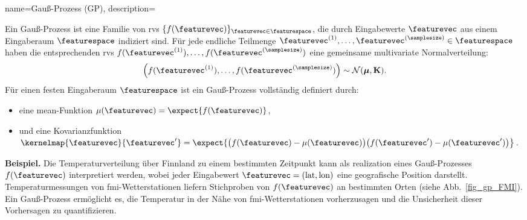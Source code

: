 {{
{name={Gauß-Prozess (GP)},
	description={Ein Gauß-Prozess ist eine Familie von \gls{rv}s 
		$\{f(\featurevec)\}_{\featurevec \in \featurespace}$, die durch Eingabewerte $\featurevec$ 
		aus einem Eingaberaum $\featurespace$ indiziert sind. Für jede endliche Teilmenge 
		$\featurevec^{(1)}, \ldots, \featurevec^{(\samplesize)} \in \featurespace$ 
		haben die entsprechenden \gls{rv}s $f(\featurevec^{(1)}), \ldots, f(\featurevec^{(\samplesize)})$ 
		eine gemeinsame multivariate Normalverteilung:
		\[
		\left( f(\featurevec^{(1)}), \ldots, f(\featurevec^{(\samplesize)}) \right) \sim \mathcal{N}(\boldsymbol{\mu}, \mathbf{K}).
		\]
		Für einen festen Eingaberaum $\featurespace$ ist ein Gauß-Prozess vollständig definiert durch:
		\begin{itemize}
			\item eine \gls{mean}-Funktion $\mu(\featurevec) = \expect\{ f(\featurevec)\}$,
			\item und eine Kovarianzfunktion $\kernelmap{\featurevec}{\featurevec'}= \expect\{ \big(f(\featurevec)-\mu(\featurevec)\big) \big(f(\featurevec')-\mu(\featurevec')\big) \big\}$.
		\end{itemize}
		\textbf{Beispiel.} Die Temperaturverteilung über Finnland zu einem bestimmten Zeitpunkt kann als \gls{realization} eines Gauß-Prozesses $f(\featurevec)$ interpretiert werden, wobei jeder Eingabewert $\featurevec = (\text{lat}, \text{lon})$ eine geografische Position darstellt. Temperaturmessungen von \gls{fmi}-Wetterstationen liefern Stichproben von $f(\featurevec)$ an bestimmten Orten (siehe Abb.\ \ref{fig_gp_FMI}). Ein Gauß-Prozess ermöglicht es, die Temperatur in der Nähe von \gls{fmi}-Wetterstationen vorherzusagen und die Unsicherheit dieser Vorhersagen zu quantifizieren.
		\begin{figure}[H]
			\begin{center}
\end{center}
\end{figure}}}}}
